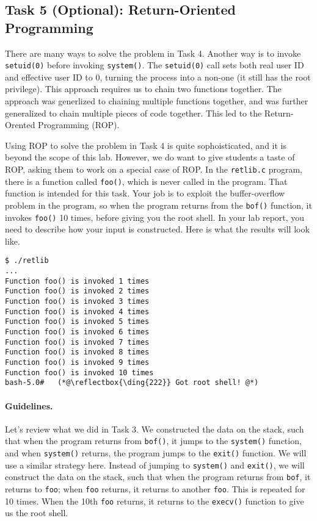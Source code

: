 \subsection{Task 5 (Optional): Return-Oriented Programming}

There are many ways to solve the problem in Task 4. 
Another way is to invoke \texttt{setuid(0)} before 
invoking \texttt{system()}. The \texttt{setuid(0)} call sets both real user ID and  
effective user ID to 0, turning the process into a non-\setuid one (it still has 
the root privilege). This approach requires us to chain two functions
together. The approach was generlized to chaining multiple functions together, and 
was further generalized to chain multiple pieces of code together. 
This led to the Return-Orented Programming (ROP). 

Using ROP to solve the problem in Task 4 is quite sophoisticated, 
and it is beyond the scope of this lab. However, we do want to
give students a taste of ROP, asking them 
to work on a special case of ROP.
In the \texttt{retlib.c} program, there is a function called \texttt{foo()}, which 
is never called in the program. That function is intended for this task. Your job is 
to exploit the buffer-overflow problem in the program, so when the program
returns from the \texttt{bof()} function, it invokes \texttt{foo()} 10 times, before
giving you the root shell. In your lab report, you need to describe how your 
input is constructed.  Here is what the results will look like. 

\begin{lstlisting}
$ ./retlib
...
Function foo() is invoked 1 times
Function foo() is invoked 2 times
Function foo() is invoked 3 times
Function foo() is invoked 4 times
Function foo() is invoked 5 times
Function foo() is invoked 6 times
Function foo() is invoked 7 times
Function foo() is invoked 8 times
Function foo() is invoked 9 times
Function foo() is invoked 10 times
bash-5.0#   (*@\reflectbox{\ding{222}} Got root shell! @*)
\end{lstlisting}
 
\paragraph{Guidelines.} Let's review what we did in Task 3. We constructed the 
data on the stack, such that when the program returns 
from \texttt{bof()}, it jumps to the \texttt{system()} function, and 
when \texttt{system()} returns, the program jumps to the \texttt{exit()} function.  
We will use a similar strategy here. Instead of jumping to \texttt{system()} 
and \texttt{exit()}, we will construct the data on the stack, such that
when the program returns from \texttt{bof}, it returns  
to \texttt{foo}; when \texttt{foo} returns, it returns to another \texttt{foo}.
This is repeated for 10 times. When the 10th \texttt{foo} returns, it returns 
to the \texttt{execv()} function to give us the root shell.  



